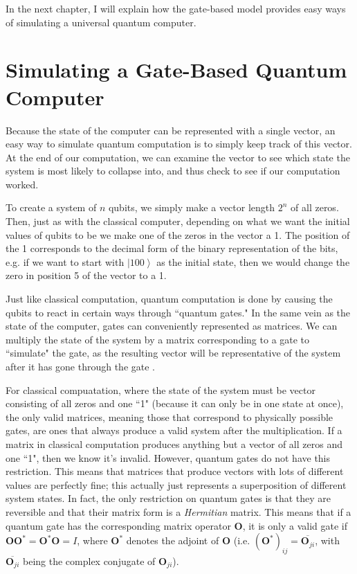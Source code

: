 \documentclass[11pt]{report}
\newcommand{\?}{\stackrel{?}{=}}
\begin{document}
In the next chapter, I will explain how the gate-based model provides easy ways of simulating a universal quantum computer.

\chapter{Simulating a Gate-Based Quantum Computer}

Because the state of the computer can be represented with a single vector, an easy way to simulate quantum computation is to simply keep track of this vector. At the end of our computation, we can examine the vector to see which state the system is most likely to collapse into, and thus check to see if our computation worked.

To create a system of $n$ qubits, we simply make a vector length $2^{n}$ of all zeros. Then, just as with the classical computer, depending on what we want the initial values of qubits to be we make one of the zeros in the vector a 1. The position of the 1 corresponds to the decimal form of the binary representation of the bits, e.g. if we want to start with $\left | 100 \right \rangle$ as the initial state, then we would change the zero in position 5 of the vector to a 1.

Just like classical computation, quantum computation is done by causing the qubits to react in certain ways through ``quantum gates." In the same vein as the state of the computer, gates can conveniently represented as matrices. We can multiply the state of the system by a matrix corresponding to a gate to ``simulate" the gate, as the resulting vector will be representative of the system after it has gone through the gate \cite{spector04}.

For classical compuatation, where the state of the system must be vector consisting of all zeros and one ``1" (because it can only be in one state at once), the only valid matrices, meaning those that correspond to physically possible gates, are ones that always produce a valid system after the multiplication. If a matrix in classical computation produces anything but a vector of all zeros and one ``1", then we know it's invalid. However, quantum gates do not have this restriction. This means that matrices that produce vectors with lots of different values are perfectly fine; this actually just represents a superposition of different system states. In fact, the only restriction on quantum gates is that they are reversible and that their matrix form is a \textit{Hermitian} matrix. This means that if a quantum gate has the corresponding matrix operator $\mathbf{O}$, it is only a valid gate if $\mathbf{O}\mathbf{O}^* = \mathbf{O}^*\mathbf{O} = I$, where $\mathbf{O}^*$ denotes the adjoint of $\mathbf{O}$ (i.e. $(\mathbf{O}^*)_{ij} = \overline{\mathbf{O}_{ji}}$, with $\overline{\mathbf{O}_{ji}}$ being the complex conjugate of $\mathbf{O}_{ji}$).
\end{document}

